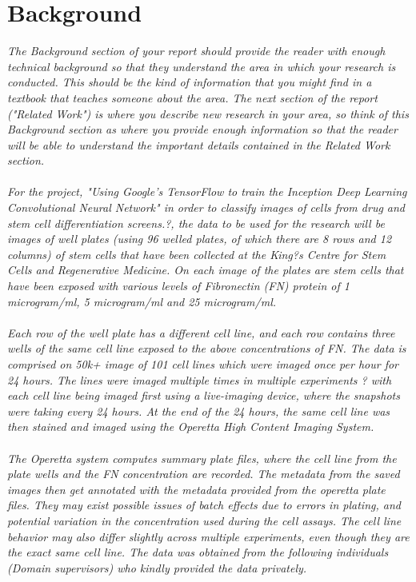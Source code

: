 \section{Background} 


\emph{The Background section of your report should provide the reader with enough technical background so that they understand the area in which your research is conducted. This should be the kind of information that you might find in a textbook that teaches someone about the area. The next section of the report ("Related Work") is where you describe new research in your area, so think of this Background section as where you provide enough information so that the reader will be able to understand the important details contained in the Related Work section. \\ \\ 
For the project, "Using Google's TensorFlow to train the Inception Deep Learning Convolutional Neural Network" in order to classify images of cells from drug and stem cell differentiation screens.?, the data to be used for the research will be images of well plates (using 96 welled plates, of which there are 8 rows and 12 columns) of stem cells that have been collected at the King?s Centre for Stem Cells and Regenerative Medicine. On each image of the plates are stem cells that have been exposed with various levels of Fibronectin (FN) protein of 1 microgram/ml, 5 microgram/ml and 25 microgram/ml. \\ \\ 
Each row of the well plate has a different cell line, and each row contains three wells of the same cell line exposed to the above concentrations of FN. The data is comprised on 50k+ image of 101 cell lines which were imaged once per hour for 24 hours. The lines were imaged multiple times in multiple experiments ? with each cell line being imaged first using a live-imaging device, where the snapshots were taking every 24 hours. At the end of the 24 hours, the same cell line was then stained and imaged using the Operetta High Content Imaging System. \\ \\ 
The Operetta system computes summary plate files, where the cell line from the plate wells and the FN concentration are recorded. The metadata from the saved images then get annotated with the metadata provided from the operetta plate files. They may exist possible issues of batch effects due to errors in plating, and potential variation in the concentration used during the cell assays. The cell line behavior may also differ slightly across multiple experiments, even though they are the exact same cell line. The data was obtained from the following individuals (Domain supervisors) who kindly provided the data privately. \\ \\ 
}
